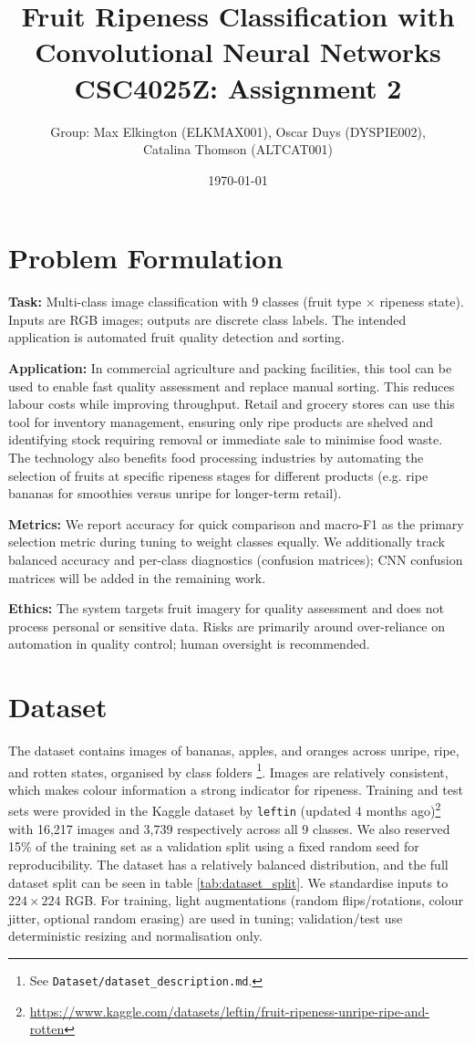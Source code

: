\documentclass[11pt,a4paper]{article}
\title{Fruit Ripeness Classification with Convolutional Neural Networks\\\large CSC4025Z: Assignment 2}
\author{Group: Max Elkington (ELKMAX001), Oscar Duys (DYSPIE002),\\ Catalina Thomson (ALTCAT001)}
\date{\today}
\begin{document}
\maketitle

\section{Problem Formulation}
\textbf{Task:} Multi-class image classification with 9 classes (fruit type \(\times\) ripeness state). Inputs are RGB images; outputs are discrete class labels. The intended application is automated fruit quality detection and sorting.

\textbf{Application:} In commercial agriculture and packing facilities, this tool can be used to enable fast quality assessment and replace manual sorting. This reduces labour costs while improving throughput. Retail and grocery stores can use this tool for inventory management, ensuring only ripe products are shelved and identifying stock requiring removal or immediate sale to minimise food waste. The technology also benefits food processing industries by automating the selection of fruits at specific ripeness stages for different products (e.g. ripe bananas for smoothies versus unripe for longer-term retail).


\textbf{Metrics:} We report accuracy for quick comparison and macro-F1 as the primary selection metric during tuning to weight classes equally. We additionally track balanced accuracy and per-class diagnostics (confusion matrices); CNN confusion matrices will be added in the remaining work.

\textbf{Ethics:} The system targets fruit imagery for quality assessment and does not process personal or sensitive data. Risks are primarily around over-reliance on automation in quality control; human oversight is recommended.

\section{Dataset}
The dataset contains images of bananas, apples, and oranges across unripe, ripe, and rotten states, organised by class folders \footnote{See \texttt{Dataset/dataset\_description.md}.}. Images are relatively consistent, which makes colour information a strong indicator for ripeness. Training and test sets were provided in the Kaggle dataset by \texttt{leftin} (updated 4 months ago)\footnote{\href{https://www.kaggle.com/datasets/leftin/fruit-ripeness-unripe-ripe-and-rotten}{https://www.kaggle.com/datasets/leftin/fruit-ripeness-unripe-ripe-and-rotten}} with 16,217 images and 3,739 respectively across all 9 classes. We also reserved 15\% of the training set as a validation split using a fixed random seed for reproducibility. The dataset has a relatively balanced distribution, and the full dataset split can be seen in table \ref{tab:dataset_split}.
We standardise inputs to \(224\times224\) RGB. For training, light augmentations (random flips/rotations, colour jitter, optional random erasing) are used in tuning; validation/test use deterministic resizing and normalisation only.
\end{document}
